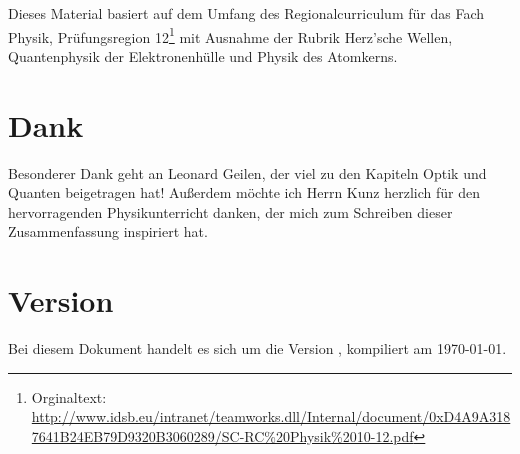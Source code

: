 Dieses Material basiert auf dem Umfang des \glqq Regionalcurriculum für das Fach Physik, Prüfungsregion 12\grqq{}\footnote{Orginaltext: \url{http://www.idsb.eu/intranet/teamworks.dll/Internal/document/0xD4A9A3187641B24EB79D9320B3060289/SC-RC\%20Physik\%2010-12.pdf}} mit Ausnahme der Rubrik \glqq Herz'sche Wellen\grqq , \glqq Quantenphysik der Elektronenhülle\grqq{} und \glqq Physik des Atomkerns\grqq .


\section*{Dank}

Besonderer Dank geht an Leonard Geilen, der viel zu den Kapiteln Optik und Quanten beigetragen hat! Außerdem möchte ich Herrn Kunz herzlich für den hervorragenden Physikunterricht danken, der mich zum Schreiben dieser Zusammenfassung inspiriert hat. 


\section*{Version}

Bei diesem Dokument handelt es sich um die Version \version , kompiliert am \today .